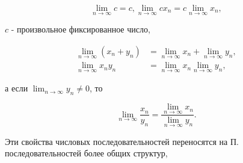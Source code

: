 \documentclass[10pt]{article}
\begin{document}
\[

\lim _{n \rightarrow \infty} c=c, \lim _{n \rightarrow \infty} c x_{n}=c \lim _{n \rightarrow \infty} x_{n},

\]



$c$ - произвольное фиксированное число,



\[

\begin{aligned}

\lim _{n \rightarrow \infty}\left(x_{n}+y_{n}\right) & =\lim _{n \rightarrow \infty} x_{n}+\lim _{n \rightarrow \infty} y_{n}, \\

\lim _{n \rightarrow \infty} x_{n} y_{n} & =\lim _{n \rightarrow \infty} x_{n} \lim _{n \rightarrow \infty} y_{n},

\end{aligned}

\]



а если $\lim _{n \rightarrow \infty} y_{n} \neq 0$, то



\[

\lim _{n \rightarrow \infty} \frac{x_{n}}{y_{n}}=\frac{\lim _{n \rightarrow \infty} x_{n}}{\lim _{n \rightarrow \infty} y_{n}} .

\]



Эти свойства числовых последовательностей переносятся на П. последовательностей более общих структур,
\end{document}
